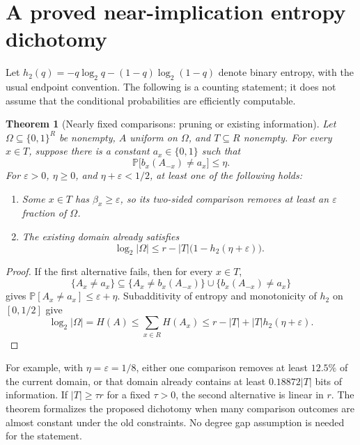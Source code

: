 \documentclass[11pt,a4paper]{article}
\newtheorem{theorem}{Theorem}
\theoremstyle{definition}
\theoremstyle{remark}
\newcommand{\Prb}{\mathbb P}
\begin{document}
\section{A proved near-implication entropy dichotomy}
\label{sec:entropy}

Let $h_2(q)=-q\log_2q-(1-q)\log_2(1-q)$ denote binary entropy, with
the usual endpoint convention. The following is a counting statement;
it does not assume that the conditional probabilities are efficiently
computable.

\begin{theorem}[Nearly fixed comparisons: pruning or existing information]
\label{thm:entropy}
Let $\Omega\subseteq\{0,1\}^R$ be nonempty, $A$ uniform on $\Omega$,
and $T\subseteq R$ nonempty. For every $x\in T$, suppose there is a
constant $a_x\in\{0,1\}$ such that
\[
 \Prb\bigl[b_x(A_{-x})\ne a_x\bigr]\le\eta.
\]
For $\varepsilon>0$, $\eta\ge0$, and
$\eta+\varepsilon<1/2$, at least one of the following holds:
\begin{enumerate}
\item Some $x\in T$ has $\beta_x\ge\varepsilon$, so its two-sided
comparison removes at least an $\varepsilon$ fraction of $\Omega$.
\item The existing domain already satisfies
\begin{equation}
 \log_2|\Omega|
 \le r-|T|\bigl(1-h_2(\eta+\varepsilon)\bigr).
                                                        \label{eq:entropy}
\end{equation}
\end{enumerate}
\end{theorem}
\begin{proof}
If the first alternative fails, then for every $x\in T$,
\[
 \{A_x\ne a_x\}\subseteq
 \{A_x\ne b_x(A_{-x})\}\cup\{b_x(A_{-x})\ne a_x\}
\]
gives $\Prb[A_x\ne a_x]\le\varepsilon+\eta$.
Subadditivity of entropy and monotonicity of $h_2$ on $[0,1/2]$ give
\[
 \log_2|\Omega|=H(A)
 \le\sum_{x\in R}H(A_x)
 \le r-|T|+|T|h_2(\eta+\varepsilon).
\]
\end{proof}

For example, with $\eta=\varepsilon=1/8$, either one comparison removes
at least $12.5\%$ of the current domain, or that domain already contains
at least $0.18872|T|$ bits of information. If $|T|\ge\tau r$ for a
fixed $\tau>0$, the second alternative is linear in $r$.
The theorem formalizes the proposed dichotomy when many comparison
outcomes are almost constant under the old constraints. No degree gap
assumption is needed for the statement.
\end{document}
